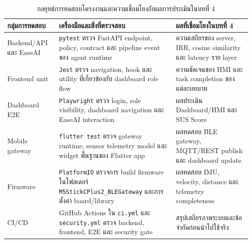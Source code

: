 \begin{table}[H]
    \centering
    \caption[กลยุทธ์การทดสอบโครงงาน]{กลยุทธ์การทดสอบโครงงานและความเชื่อมโยงกับผลการประเมินในบทที่ 4}
    \label{tab:ch3_testing_strategy}
    \small
    \renewcommand{\arraystretch}{1.18}
    \begin{tabular}{|L{3.1cm}|L{4.8cm}|L{4.7cm}|}
        \hline
        \textbf{กลุ่มการทดสอบ} & \textbf{เครื่องมือและสิ่งที่ตรวจสอบ} & \textbf{ผลที่เชื่อมโยงในบทที่ 4} \\ \hline
        Backend/API และ EaseAI & \texttt{pytest} ตรวจ FastAPI endpoint, policy, contract และ pipeline event ของ agent runtime & ความเสถียรของ server, IRR, cosine similarity และ latency ราย layer \\ \hline
        Frontend unit & \texttt{Jest} ตรวจ navigation, hook และ utility ที่เกี่ยวข้องกับ dashboard role flow & ความชัดเจนของ HMI และ task completion ของแต่ละบทบาท \\ \hline
        Dashboard E2E & \texttt{Playwright} ตรวจ login, role visibility, dashboard navigation และ EaseAI interaction & ผลประเมิน Dashboard/HMI และ SUS Score \\ \hline
        Mobile gateway & \texttt{flutter test} ตรวจ gateway runtime, sensor telemetry model และ widget พื้นฐานของ Flutter app & ผลทดสอบ BLE gateway, MQTT/REST publish และ dashboard update \\ \hline
        Firmware & \texttt{PlatformIO} ตรวจการ build firmware ในโฟลเดอร์ \texttt{M5StickCPlus2\_BLEGateway} และการตั้งค่า board/library & ผลทดสอบ IMU, velocity, distance และ telemetry completeness \\ \hline
        CI/CD & GitHub Actions ใน \texttt{ci.yml} และ \texttt{security.yml} ตรวจ backend, frontend, E2E และ security gate & สรุปเสถียรภาพระบบและข้อจำกัดก่อนนำไปใช้จริง \\ \hline
    \end{tabular}
\end{table}

